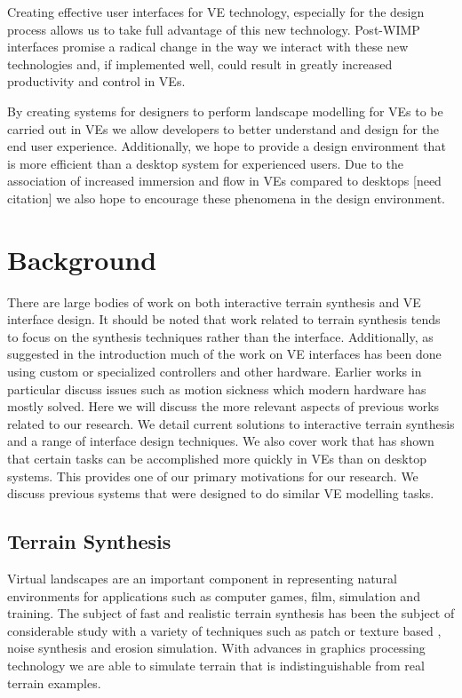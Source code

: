 \documentclass{sig-alternate-05-2015}
\begin{document}
Creating effective user interfaces for VE technology, especially for the design process allows us to take full advantage of this new technology. Post-WIMP interfaces promise a radical change in the way we interact with these new technologies and, if implemented well, could result in greatly increased productivity and control in VEs.
 
 By creating systems for designers to perform landscape modelling for VEs to be carried out in VEs we allow developers to better understand and design for the end user experience. Additionally, we hope to provide a design environment that is more efficient than a desktop system for experienced users. Due to the association of increased immersion and flow in VEs compared to desktops [need citation] we also hope to encourage these phenomena in the design environment.
\section{Background}
There are large bodies of work on both interactive terrain synthesis and VE interface design. It should be noted that work related to terrain synthesis tends to focus on the synthesis techniques rather than the interface. Additionally, as suggested in the introduction much of the work on VE interfaces has been done using custom or specialized controllers and other hardware. Earlier works in particular discuss issues such as motion sickness which modern hardware has mostly solved. Here we will discuss the more relevant aspects of previous works related to our research. We detail current solutions to interactive terrain synthesis and a range of interface design techniques. We also cover work that has shown that certain tasks can be accomplished more quickly in VEs than on desktop systems. This provides one of our primary motivations for our research. We discuss previous systems that were designed to do similar VE modelling tasks. 
\subsection{Terrain Synthesis} 
Virtual landscapes are an important component in representing natural environments for applications such as computer games, film, simulation and training\cite{Gain2015}. The subject of fast and realistic terrain synthesis has been the subject of considerable study with a variety of techniques such as patch or texture based \cite{Cruz2015, Tasse2012}, noise synthesis\cite{Musgrave1989} and erosion simulation\cite{Anh2007}. With advances in graphics processing technology we are able to simulate terrain that is indistinguishable from real terrain examples\cite{Gain2015}. 
\end{document}
